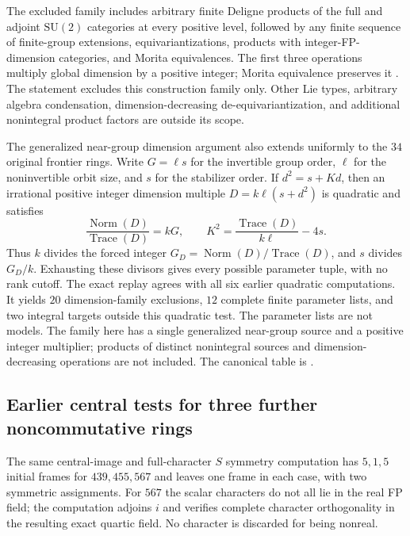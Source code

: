 The excluded family includes arbitrary finite Deligne products of the
full and adjoint $\mathrm{SU}(2)$ categories at every positive level,
followed by any finite sequence of finite-group extensions,
equivariantizations, products with integer-FP-dimension categories, and
Morita equivalences. The first three operations multiply global
dimension by a positive integer; Morita equivalence preserves it
\cite[Corollary~8.14]{ENO}. The statement excludes this construction
family only. Other Lie types, arbitrary algebra condensation,
dimension-decreasing de-equivariantization, and additional nonintegral
product factors are outside its scope.

The generalized near-group dimension argument also extends uniformly
to the $34$ original frontier rings. Write $G=\ell s$ for the invertible
group order, $\ell$ for the noninvertible orbit size, and $s$ for the
stabilizer order. If $d^2=s+Kd$, then an irrational positive integer
dimension multiple $D=k\ell(s+d^2)$ is quadratic and satisfies
\[
 \frac{\operatorname{Norm}(D)}{\operatorname{Trace}(D)}=kG,
 \qquad K^2=\frac{\operatorname{Trace}(D)}{k\ell}-4s.
\]
Thus $k$ divides the forced integer $G_D=\operatorname{Norm}(D)/
\operatorname{Trace}(D)$, and $s$ divides $G_D/k$. Exhausting these
divisors gives every possible parameter tuple, with no rank cutoff.
The exact replay agrees with all six earlier quadratic computations.
It yields $20$ dimension-family exclusions, $12$ complete finite
parameter lists, and two integral targets outside this quadratic test.
The parameter lists are not models. The family here has a single
generalized near-group source and a positive integer multiplier;
products of distinct nonintegral sources and dimension-decreasing
operations are not included. The canonical table is
.

\subsection{Earlier central tests for three further noncommutative rings}
\label{subsec:frontier-additional-nc-central}

The same central-image and full-character $S$ symmetry computation has
$5,1,5$ initial frames for $439,455,567$ and leaves one frame in each
case, with two symmetric assignments. For $567$ the scalar characters
do not all lie in the real FP field; the computation adjoins $i$ and
verifies complete character orthogonality in the resulting exact
quartic field. No character is discarded for being nonreal.

